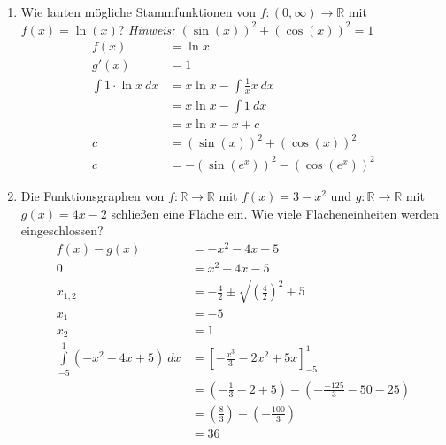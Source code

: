 \documentclass[12pt]{article}
\begin{document}
\begin{enumerate}[start=1,label={\bfseries Frage \arabic*:},leftmargin=1in]
    \item Wie lauten mögliche Stammfunktionen von $f:(0,\infty) \to \mathbb{R}$ mit $f(x)=\ln{(x)}$?
    \textit{Hinweis: $(\sin{(x)})^2 + (\cos{(x)})^2 = 1$}
    \begin{align*}
        f(x)&=\ln{x} \\
        g'(x)&=1 \\
        \int 1 \cdot \ln{x} \: dx &= x\ln{x} - \int \frac{1}{x} x \: dx \\
        &= x\ln{x} - \int 1 \: dx \\
        &= x \ln{x} - x + c \\
        c &= (\sin{(x)})^2 + (\cos{(x)})^2 \\
        c &= -(\sin{(e^x)})^2 - (\cos{(e^x)})^2
    \end{align*}

    \item Die Funktionsgraphen von $f:\mathbb{R} \to \mathbb{R}$ mit $f(x)=3-x^2$ und $g:\mathbb{R} \to \mathbb{R}$ mit $g(x)=4x-2$ schließen eine Fläche ein. Wie viele Flächeneinheiten werden eingeschlossen?
    \begin{align*}
        f(x)-g(x) &=-x^2 -4x +5 \\
        0&=x^2 + 4x -5 \\
        x_{1,2} &= -\frac{4}{2} \pm \sqrt{\left(\frac{4}{2}\right)^2 + 5} \\
        x_1 &= -5 \\
        x_2 &= 1 \\
        \int\limits_{-5}^{1} \left(-x^2 -4x +5\right) \: dx &= \left[-\frac{x^3}{3} - 2x^{2} + 5x \right]_{-5}^{1}\\
        &=\left(-\frac{1}{3} - 2 + 5\right) - \left(-\frac{-125}{3} - 50 - 25\right) \\
        &=\left(\frac{8}{3}\right) - \left(-\frac{100}{3}\right) \\
        &=36
    \end{align*}
\end{enumerate}
\end{document}
